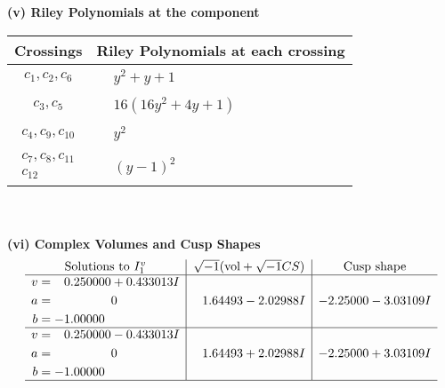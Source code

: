 \documentclass[1p]{elsarticle_modified}
\theoremstyle{definition}
\newcommand{\I}{\sqrt{-1}}
\begin{document}
\newpage\renewcommand{\arraystretch}{1}
\flushleft \textbf{(v) Riley Polynomials at the component}\newline \\
\begin{tabular}{m{50pt}|m{274pt}}
Crossings & \hspace{64pt}Riley Polynomials at each crossing \\
\hline $$\begin{aligned}c_{1},c_{2},c_{6}\end{aligned}$$&$\begin{aligned}
&y^2+y+1
\end{aligned}$\\
\hline $$\begin{aligned}c_{3},c_{5}\end{aligned}$$&$\begin{aligned}
&16(16 y^2+4 y+1)
\end{aligned}$\\
\hline $$\begin{aligned}c_{4},c_{9},c_{10}\end{aligned}$$&$\begin{aligned}
&y^2
\end{aligned}$\\
\hline $$\begin{aligned}c_{7},c_{8},c_{11}\\c_{12}\end{aligned}$$&$\begin{aligned}
&(y-1)^2
\end{aligned}$\\
\hline
\end{tabular}\\~\\
\newpage\flushleft \textbf{(vi) Complex Volumes and Cusp Shapes}
$$\begin{array}{c|c|c}  
\text{Solutions to }I^v_{1}& \I (\text{vol} + \sqrt{-1}CS) & \text{Cusp shape}\\
 \hline 
\begin{aligned}
v &= \phantom{-}0.250000 + 0.433013 I \\
a &= \phantom{-0.000000 } 0 \\
b &= -1.00000\phantom{ +0.000000I}\end{aligned}
 & \phantom{-}1.64493 - 2.02988 I & -2.25000 - 3.03109 I \\ \hline\begin{aligned}
v &= \phantom{-}0.250000 - 0.433013 I \\
a &= \phantom{-0.000000 } 0 \\
b &= -1.00000\phantom{ +0.000000I}\end{aligned}
 & \phantom{-}1.64493 + 2.02988 I & -2.25000 + 3.03109 I\\
 \hline 
 \end{array}$$\newpage
\end{document}
